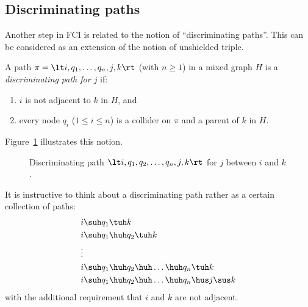 \subsection{Discriminating paths}

Another step in FCI is related to the notion of ``discriminating paths''.
This can be considered as an extension of the notion of unshielded triple.


\begin{Def}\label{def:discriminating_path}
  A path $\pi = \lt i, q_1, \dots, q_n, j, k\rt$ (with $n \ge 1$) in a mixed graph $H$ is
  a \emph{discriminating path for $j$} if:
  \begin{enumerate}[label=(\roman*)]
    \item $i$ is not adjacent to $k$ in $H$, and
    \item every node $q_i$ ($1 \le i \le n$) is a collider on $\pi$ and a parent of $k$ in $H$.
  \end{enumerate}
\end{Def}
Figure~\ref{fig:discriminating_path} illustrates this notion.

\begin{figure}\centering
  \caption{Discriminating path $\lt i,q_1,q_2,\dots,q_n,j,k \rt$ for $j$ between $i$ and $k$.\label{fig:discriminating_path}}
\end{figure}

\begin{Rem}\label{rem:discriminating_path}
  It is instructive to think about a discriminating path rather as a certain collection of paths:
  \begin{align*}
    &i \suh q_1 \tuh k \\
    &i \suh q_1 \huh q_2 \tuh k \\
    &\vdots \\
    &i \suh q_1 \huh q_2 \huh \dots \huh q_n \tuh k \\
    &i \suh q_1 \huh q_2 \huh \dots \huh q_n \hus j \sus k
  \end{align*}
  with the additional requirement that $i$ and $k$ are not adjacent.
\end{Rem}

